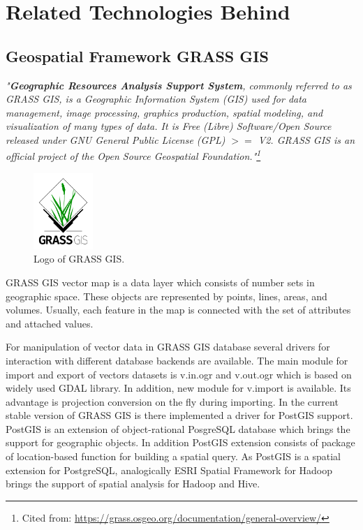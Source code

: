 \documentclass[a4paper,12pt,oneside]{report}
\begin{document}
	
	\section{Related Technologies Behind}
	\subsection{Geospatial Framework GRASS GIS}
	
	\textit{"\textbf{Geographic Resources Analysis Support System}, 
		commonly referred to as GRASS GIS, is a Geographic Information System (GIS) used
		for data management, image processing, graphics production, 
		spatial modeling, and visualization of many types of data. It is Free (Libre)
		Software/Open Source released under GNU General Public License 
		(GPL) $>=$ V2. GRASS GIS is an official project of the Open Source Geospatial
		Foundation."\footnote{Cited from:
			\url{https://grass.osgeo.org/documentation/general-overview/}}}
	
	\begin{figure}[!htbp]
		\centering
		\includegraphics[width=0.2\textwidth]{./img/grasslogo.png}
		\caption[Logo GRASS]{\centering Logo of GRASS GIS.}
	\end{figure}   

	GRASS GIS vector map is a data layer which consists of number sets in
	geographic space. These objects are represented by points, lines, areas, and volumes. Usually,
	each feature in the map is  connected with the set of attributes and attached  values.
	
	For manipulation of vector data in GRASS GIS database several drivers for interaction with different database backends are available. The main module for import and export of vectors datasets is
	v.in.ogr and v.out.ogr which is based on widely used GDAL library. In addition, new module for v.import is available. Its advantage is projection conversion on the fly during importing.
	In the current stable version of GRASS GIS is there implemented a driver for PostGIS
	support. PostGIS is an extension of object-rational PosgreSQL database which brings the support for
	geographic objects. In addition PostGIS extension consists of package of 
	location-based function for building a spatial query.  
	As PostGIS is a spatial extension for PostgreSQL, analogically ESRI Spatial
	Framework for Hadoop brings the support of spatial analysis for Hadoop and  Hive.
	
\end{document}
